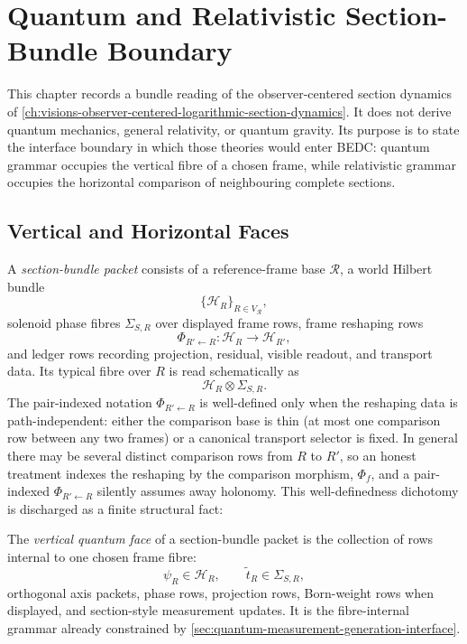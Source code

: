 \chapter{Quantum and Relativistic Section-Bundle Boundary}
\label{ch:visions-quantum-gr-section-bundle-boundary}

This chapter records a bundle reading of the
observer-centered section dynamics of
\autoref{ch:visions-observer-centered-logarithmic-section-dynamics}. It
does not derive quantum mechanics, general relativity, or quantum gravity.
Its purpose is to state the interface boundary in which those theories
would enter BEDC: quantum grammar occupies the vertical fibre of a chosen
frame, while relativistic grammar occupies the horizontal comparison of
neighbouring complete sections.

\section{Vertical and Horizontal Faces}
\label{sec:quantum-gr-vertical-horizontal-faces}

\begin{definition}
\label{def:quantum-gr-section-bundle-packet}
A \emph{section-bundle packet} consists of a reference-frame base
$\mathcal R$, a world Hilbert bundle
$$
\{\mathcal H_R\}_{R\in V_{\mathcal R}},
$$
solenoid phase fibres $\Sigma_{S,R}$ over displayed frame rows, frame
reshaping rows
$$
\Phi_{R'\leftarrow R}:\mathcal H_R\to\mathcal H_{R'},
$$
and ledger rows recording projection, residual, visible readout, and
transport data. Its typical fibre over $R$ is read schematically as
$$
\mathcal H_R\otimes\Sigma_{S,R}.
$$
The pair-indexed notation $\Phi_{R'\leftarrow R}$ is well-defined only
when the reshaping data is path-independent: either the comparison base is
thin (at most one comparison row between any two frames) or a canonical
transport selector is fixed. In general there may be several distinct
comparison rows from $R$ to $R'$, so an honest treatment indexes the
reshaping by the comparison morphism, $\Phi_f$, and a pair-indexed
$\Phi_{R'\leftarrow R}$ silently assumes away holonomy. This
well-definedness dichotomy is discharged as a finite structural fact:
\end{definition}

\begin{definition}
\label{def:quantum-gr-vertical-quantum-face}
The \emph{vertical quantum face} of a section-bundle packet is the
collection of rows internal to one chosen frame fibre:
$$
\psi_R\in\mathcal H_R,\qquad
\widetilde t_R\in\Sigma_{S,R},
$$
orthogonal axis packets, phase rows, projection rows, Born-weight rows
when displayed, and section-style measurement updates. It is the
fibre-internal grammar already constrained by
\autoref{sec:quantum-measurement-generation-interface}.
\end{definition}

